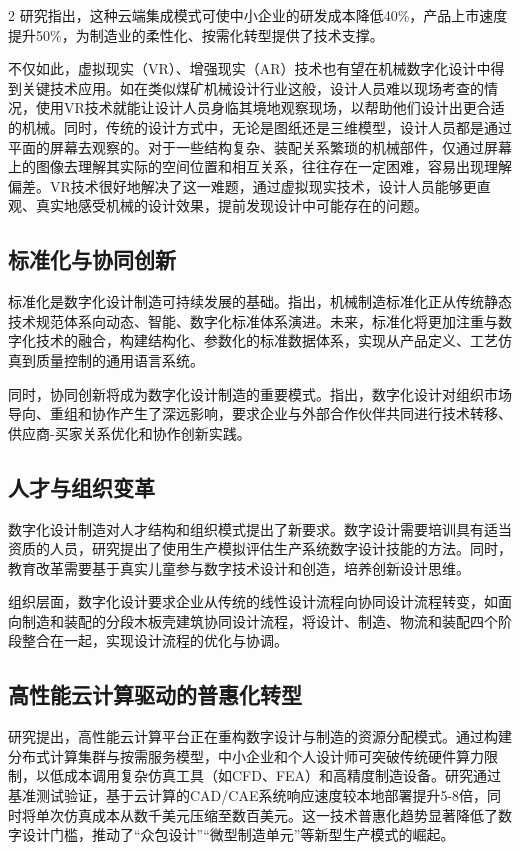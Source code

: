 \documentclass[fontset=windows,12pt,UTF8]{ctexart}
\begin{document}
\begin{multicols}{2}
	研究指出，这种云端集成模式可使中小企业的研发成本降低40\%，产品上市速度提升50\%，为制造业的柔性化、按需化转型提供了技术支撑\cite{xie_cloud_2019}。

	不仅如此，虚拟现实（VR）、增强现实（AR）技术也有望在机械数字化设计中得到关键技术应用。如在类似煤矿机械设计行业这般，设计人员难以现场考查的情况，使用VR技术就能让设计人员身临其境地观察现场，以帮助他们设计出更合适的机械。同时，传统的设计方式中，无论是图纸还是三维模型，设计人员都是通过平面的屏幕去观察的。对于一些结构复杂、装配关系繁琐的机械部件，仅通过屏幕上的图像去理解其实际的空间位置和相互关系，往往存在一定困难，容易出现理解偏差。VR技术很好地解决了这一难题，通过虚拟现实技术，设计人员能够更直观、真实地感受机械的设计效果，提前发现设计中可能存在的问题。\cite{__2025-7}

	\subsection{标准化与协同创新}

	标准化是数字化设计制造可持续发展的基础。\cite{__2025-5}指出，机械制造标准化正从传统静态技术规范体系向动态、智能、数字化标准体系演进。未来，标准化将更加注重与数字化技术的融合，构建结构化、参数化的标准数据体系，实现从产品定义、工艺仿真到质量控制的通用语言系统。

	同时，协同创新将成为数字化设计制造的重要模式。\cite{dabic_market_2023}指出，数字化设计对组织市场导向、重组和协作产生了深远影响，要求企业与外部合作伙伴共同进行技术转移、供应商-买家关系优化和协作创新实践。

	\subsection{人才与组织变革}

	数字化设计制造对人才结构和组织模式提出了新要求。数字设计需要培训具有适当资质的人员，研究提出了使用生产模拟评估生产系统数字设计技能的方法。同时，教育改革需要基于真实儿童参与数字技术设计和创造，培养创新设计思维\cite{li_digital_2024}。

	组织层面，数字化设计要求企业从传统的线性设计流程向协同设计流程转变，如面向制造和装配的分段木板壳建筑协同设计流程，将设计、制造、物流和装配四个阶段整合在一起，实现设计流程的优化与协调\cite{__2025-1}。

	\subsection{高性能云计算驱动的普惠化转型}

	研究提出，高性能云计算平台正在重构数字设计与制造的资源分配模式。通过构建分布式计算集群与按需服务模型，中小企业和个人设计师可突破传统硬件算力限制，以低成本调用复杂仿真工具（如CFD、FEA）和高精度制造设备。研究通过基准测试验证，基于云计算的CAD/CAE系统响应速度较本地部署提升5-8倍，同时将单次仿真成本从数千美元压缩至数百美元。这一技术普惠化趋势显著降低了数字设计门槛，推动了“众包设计”“微型制造单元”等新型生产模式的崛起\cite{wu_democratizing_2017}。


\end{multicols}
\end{document}

